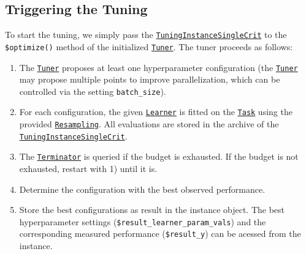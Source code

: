 \documentclass[]{scrbook}
\newenvironment{Shaded}{\begin{snugshade}}{\end{snugshade}}
\newcommand{\KeywordTok}[1]{\textcolor[rgb]{0.13,0.29,0.53}{\textbf{#1}}}
\newcommand{\NormalTok}[1]{#1}
\newcommand{\OperatorTok}[1]{\textcolor[rgb]{0.81,0.36,0.00}{\textbf{#1}}}
\providecommand{\tightlist}{%
  \setlength{\itemsep}{0pt}\setlength{\parskip}{0pt}}
\renewenvironment{Shaded} {\begin{snugshade}\small} {\end{snugshade}}
\begin{document}
\hypertarget{tuning-triggering}{%
\subsection{Triggering the Tuning}\label{tuning-triggering}}

To start the tuning, we simply pass the \href{https://mlr3tuning.mlr-org.com/reference/TuningInstanceSingleCrit.html}{\texttt{TuningInstanceSingleCrit}} to the \texttt{\$optimize()} method of the initialized \href{https://mlr3tuning.mlr-org.com/reference/Tuner.html}{\texttt{Tuner}}.
The tuner proceeds as follows:

\begin{enumerate}
\def\labelenumi{\arabic{enumi}.}
\tightlist
\item
  The \href{https://mlr3tuning.mlr-org.com/reference/Tuner.html}{\texttt{Tuner}} proposes at least one hyperparameter configuration (the \href{https://mlr3tuning.mlr-org.com/reference/Tuner.html}{\texttt{Tuner}} may propose multiple points to improve parallelization, which can be controlled via the setting \texttt{batch\_size}).
\item
  For each configuration, the given \href{https://mlr3.mlr-org.com/reference/Learner.html}{\texttt{Learner}} is fitted on the \href{https://mlr3.mlr-org.com/reference/Task.html}{\texttt{Task}} using the provided \href{https://mlr3.mlr-org.com/reference/Resampling.html}{\texttt{Resampling}}.
  All evaluations are stored in the archive of the \href{https://mlr3tuning.mlr-org.com/reference/TuningInstanceSingleCrit.html}{\texttt{TuningInstanceSingleCrit}}.
\item
  The \href{https://bbotk.mlr-org.com/reference/Terminator.html}{\texttt{Terminator}} is queried if the budget is exhausted.
  If the budget is not exhausted, restart with 1) until it is.
\item
  Determine the configuration with the best observed performance.
\item
  Store the best configurations as result in the instance object.
  The best hyperparameter settings (\texttt{\$result\_learner\_param\_vals}) and the corresponding measured performance (\texttt{\$result\_y}) can be acessed from the instance.
\end{enumerate}

\begin{Shaded}
\end{Shaded}
\end{document}
